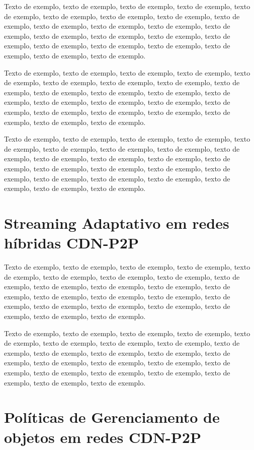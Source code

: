 \documentclass[
	12pt,				%
	oneside,			%
	a4paper,			%
	english,			%
	brazil				%
	]{abntex2ppgsi}
\begin{document}
Texto de exemplo, texto de exemplo, texto de exemplo, texto de exemplo, texto de exemplo, texto de exemplo, texto de exemplo, texto de exemplo, texto de exemplo, texto de exemplo, texto de exemplo, texto de exemplo, texto de exemplo, texto de exemplo, texto de exemplo, texto de exemplo, texto de exemplo, texto de exemplo, texto de exemplo, texto de exemplo, texto de exemplo, texto de exemplo, texto de exemplo.

Texto de exemplo, texto de exemplo, texto de exemplo, texto de exemplo, texto de exemplo, texto de exemplo, texto de exemplo, texto de exemplo, texto de exemplo, texto de exemplo, texto de exemplo, texto de exemplo, texto de exemplo, texto de exemplo, texto de exemplo, texto de exemplo, texto de exemplo, texto de exemplo, texto de exemplo, texto de exemplo, texto de exemplo, texto de exemplo, texto de exemplo.

Texto de exemplo, texto de exemplo, texto de exemplo, texto de exemplo, texto de exemplo, texto de exemplo, texto de exemplo, texto de exemplo, texto de exemplo, texto de exemplo, texto de exemplo, texto de exemplo, texto de exemplo, texto de exemplo, texto de exemplo, texto de exemplo, texto de exemplo, texto de exemplo, texto de exemplo, texto de exemplo, texto de exemplo, texto de exemplo, texto de exemplo.

\section{Streaming Adaptativo em redes híbridas CDN-P2P}

Texto de exemplo, texto de exemplo, texto de exemplo, texto de exemplo, texto de exemplo, texto de exemplo, texto de exemplo, texto de exemplo, texto de exemplo, texto de exemplo, texto de exemplo, texto de exemplo, texto de exemplo, texto de exemplo, texto de exemplo, texto de exemplo, texto de exemplo, texto de exemplo, texto de exemplo, texto de exemplo, texto de exemplo, texto de exemplo, texto de exemplo.

Texto de exemplo, texto de exemplo, texto de exemplo, texto de exemplo, texto de exemplo, texto de exemplo, texto de exemplo, texto de exemplo, texto de exemplo, texto de exemplo, texto de exemplo, texto de exemplo, texto de exemplo, texto de exemplo, texto de exemplo, texto de exemplo, texto de exemplo, texto de exemplo, texto de exemplo, texto de exemplo, texto de exemplo, texto de exemplo, texto de exemplo.

\section{Políticas de Gerenciamento de objetos em redes CDN-P2P}
\end{document}

